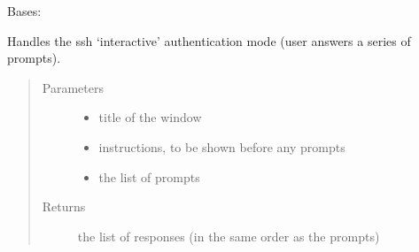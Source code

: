 \documentclass[letterpaper,12pt,english]{sphinxmanual}
\begin{document}
\begin{fulllineitems}
\label{\detokenize{PARyOpt.evaluators:PARyOpt.evaluators.connection.Host}}
\sphinxAtStartPar
Bases: 

\begin{fulllineitems}
\label{\detokenize{PARyOpt.evaluators:PARyOpt.evaluators.connection.Host.get_interactive}}
\sphinxAtStartPar
Handles the ssh ‘interactive’ authentication mode (user answers a series of prompts).
\begin{quote}\begin{description}
\item[{Parameters}] \leavevmode\begin{itemize}
\item {} 
\sphinxAtStartPar
{} \textendash{} title of the window

\item {} 
\sphinxAtStartPar
{} \textendash{} instructions, to be shown before any prompts

\item {} 
\sphinxAtStartPar
{} \textendash{} the list of prompts

\end{itemize}

\item[{Returns}] \leavevmode
\sphinxAtStartPar
the list of responses (in the same order as the prompts)

\end{description}\end{quote}


\end{fulllineitems}
\end{fulllineitems}
\end{document}
